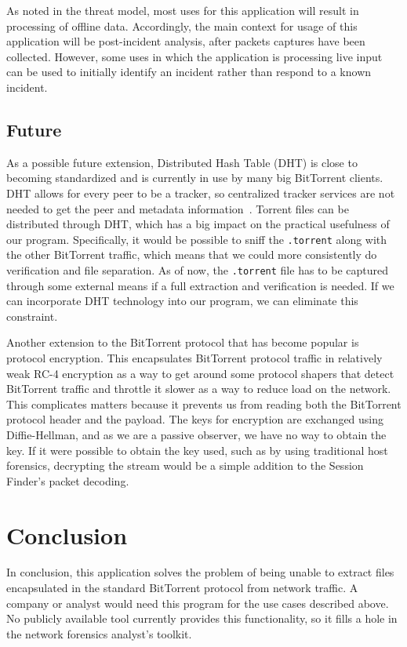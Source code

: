 \documentclass{acm_proc_article-sp}
\begin{document}
As noted in the threat model, most uses for this application will result in
processing of offline data. Accordingly, the main context for usage of this
application will be post-incident analysis, after packets captures have been
collected. However, some uses in which the application is processing live input
can be used to initially identify an incident rather than respond to a known
incident.

\subsection{Future}
As a possible future extension, Distributed Hash Table (DHT) is close to
becoming standardized and is currently in use by many big BitTorrent clients.
DHT allows for every peer to be a tracker, so centralized tracker services are
not needed to get the peer and metadata information~\cite{dhtext}. Torrent files
can be distributed through DHT, which has a big impact on the practical
usefulness of our program.  Specifically, it would be possible to sniff the
\texttt{.torrent} along with the other BitTorrent traffic, which means that we
could more consistently do verification and file separation. As of now, the
\texttt{.torrent} file has to be captured through some external means if a full
extraction and verification is needed.  If we can incorporate DHT technology
into our program, we can eliminate this constraint.

Another extension to the BitTorrent protocol that has become popular is protocol
encryption.  This encapsulates BitTorrent protocol traffic in relatively weak
RC-4 encryption as a way to get around some protocol shapers that detect
BitTorrent traffic and throttle it slower as a way to reduce load on the
network. This complicates matters because it prevents us from reading both the
BitTorrent protocol header and the payload. The keys for encryption are
exchanged using Diffie-Hellman, and as we are a passive observer, we have no way
to obtain the key.  If it were possible to obtain the key used, such as by using
traditional host forensics, decrypting the stream would be a simple addition to
the Session Finder's packet decoding.

\section{Conclusion}
In conclusion, this application solves the problem of being unable to extract
files encapsulated in the standard BitTorrent protocol from network traffic.  A
company or analyst would need this program for the use cases described above.
No publicly available tool currently provides this functionality, so it fills a
hole in the network forensics analyst's toolkit.

\nocite{*}


\end{document}
